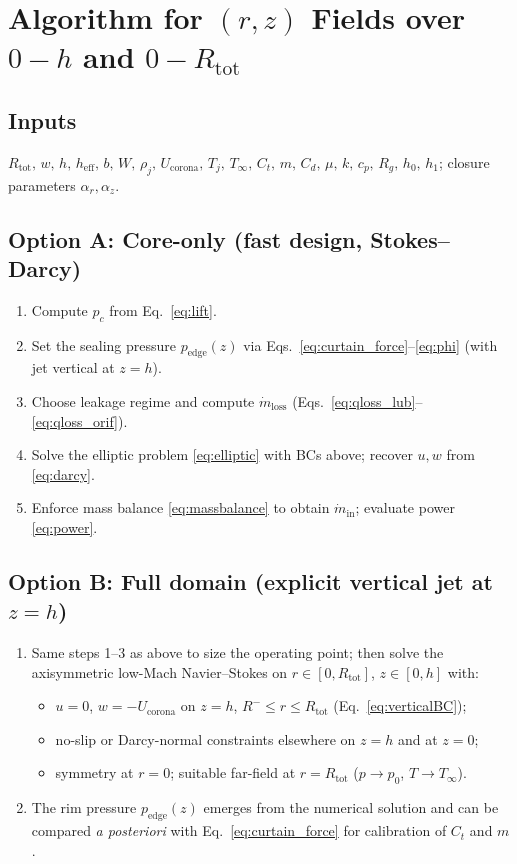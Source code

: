 \documentclass[11pt,a4paper]{article}
\begin{document}
\section{Algorithm for $(r,z)$ Fields over $0\!-\!h$ and $0\!-\!R_{\text{tot}}$}
\subsection*{Inputs}
$R_{\text{tot}},\,w,\,h,\,h_{\mathrm{eff}},\,b,\,W,\,\rho_j,\,U_{\mathrm{corona}},\,T_j,\,T_\infty,\,C_t,\,m,\,C_d,\,\mu,\,k,\,c_p,\,R_g,\,h_0,\,h_1$; closure parameters $\alpha_r,\alpha_z$.

\subsection*{Option A: Core-only (fast design, Stokes--Darcy)}
\begin{enumerate}
  \item Compute $p_c$ from Eq.~\eqref{eq:lift}.
  \item Set the sealing pressure $p_\mathrm{edge}(z)$ via Eqs.~\eqref{eq:curtain_force}--\eqref{eq:phi} (with jet vertical at $z=h$).
  \item Choose leakage regime and compute $\dot m_{\mathrm{loss}}$ (Eqs.~\eqref{eq:qloss_lub}--\eqref{eq:qloss_orif}).
  \item Solve the elliptic problem \eqref{eq:elliptic} with BCs above; recover $u,w$ from \eqref{eq:darcy}.
  \item Enforce mass balance \eqref{eq:massbalance} to obtain $\dot m_{\mathrm{in}}$; evaluate power \eqref{eq:power}.
\end{enumerate}

\subsection*{Option B: Full domain (explicit vertical jet at $z=h$)}
\begin{enumerate}
  \item Same steps 1--3 as above to size the operating point; then solve the axisymmetric low-Mach Navier--Stokes on $r\in[0,R_{\text{tot}}]$, $z\in[0,h]$ with:
  \begin{itemize}
    \item $u=0$, $w=-U_{\mathrm{corona}}$ on $z=h$, $R^-\le r\le R_{\text{tot}}$ (Eq.~\eqref{eq:verticalBC});
    \item no-slip or Darcy-normal constraints elsewhere on $z=h$ and at $z=0$;
    \item symmetry at $r=0$; suitable far-field at $r=R_{\text{tot}}$ ($p\to p_0$, $T\to T_\infty$).
  \end{itemize}
  \item The rim pressure $p_\mathrm{edge}(z)$ emerges from the numerical solution and can be compared \emph{a posteriori} with Eq.~\eqref{eq:curtain_force} for calibration of $C_t$ and $m$.
\end{enumerate}
\end{document}
